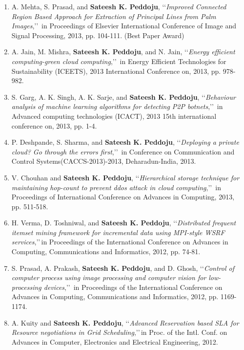\begin{enumerate}[label=(C\arabic*).]
	\item
	A. Mehta, S. Prasad, and  \textbf{Sateesh K. Peddoju}, \lq\lq \textit{Improved Connected Region Based Approach for Extraction of Principal Lines from Palm Images},\rq\rq\, in Proceedings of Elsevier International Conference of Image and Signal Processing, 2013, pp. 104-111. (Best Paper Award)
	
	\item
	A. Jain, M. Mishra, \textbf{Sateesh K. Peddoju}, and N. Jain, \lq\lq \textit{Energy efficient computing-green cloud computing},\rq\rq\, in Energy Efficient Technologies for Sustainability (ICEETS), 2013 International Conference on, 2013, pp. 978-982.
	
	\item
	S. Garg, A. K. Singh, A. K. Sarje, and \textbf{Sateesh K. Peddoju}, \lq\lq \textit{Behaviour analysis of machine learning algorithms for detecting P2P botnets},\rq\rq\, in Advanced computing technologies (ICACT), 2013 15th international conference on, 2013, pp. 1-4.
	
	\item
	P. Deshpande, S. Sharma, and \textbf{Sateesh K. Peddoju}, \lq\lq \textit{Deploying a private cloud? Go through the errors first},\rq\rq\, in Conference on Communication and Control Systems(CACCS-2013)-2013, Deharadun-India, 2013.
	
	
	\item
	V. Chouhan and \textbf{Sateesh K. Peddoju}, \lq\lq \textit{Hierarchical storage technique for maintaining hop-count to prevent ddos attack in cloud computing},\rq\rq\, in Proceedings of International Conference on Advances in Computing, 2013, pp. 511-518.
	
	\item
	H. Verma, D. Toshniwal, and  \textbf{Sateesh K. Peddoju}, \lq\lq \textit{Distributed frequent itemset mining framework for incremental data using MPI-style WSRF services},\rq\rq\,in Proceedings of the International Conference on Advances in Computing, Communications and Informatics, 2012, pp. 74-81.
	
	\item
	S. Prasad, A. Prakash, \textbf{Sateesh K. Peddoju}, and D. Ghosh, \lq\lq \textit{Control of computer process using image processing and computer vision for low-processing devices},\rq\rq\, in Proceedings of the International Conference on Advances in Computing, Communications and Informatics, 2012, pp. 1169-1174.
	
	\item
	A. Kuity and \textbf{Sateesh K. Peddoju}, \lq\lq \textit{Advanced Reservation based SLA for Resource negotiations in Grid Scheduling},\rq\rq\,in Proc. of the Intl. Conf. on Advances in Computer, Electronics and Electrical Engineering, 2012.
	
	\end{enumerate}
